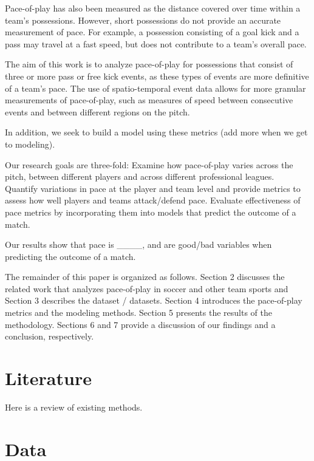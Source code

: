 \documentclass[]{book}
\begin{document}
Pace-of-play has also been measured as the distance covered over time within a team's possessions. However, short possessions do not provide an accurate measurement of pace. For example, a possession consisting of a goal kick and a pass may travel at a fast speed, but does not contribute to a team's overall pace.

The aim of this work is to analyze pace-of-play for possessions that consist of three or more pass or free kick events, as these types of events are more definitive of a team's pace. The use of spatio-temporal event data allows for more granular measurements of pace-of-play, such as measures of speed between consecutive events and between different regions on the pitch.

In addition, we seek to build a model using these metrics (add more when we get to modeling).

Our research goals are three-fold:
Examine how pace-of-play varies across the pitch, between different players and across different professional leagues.\\
Quantify variations in pace at the player and team level and provide metrics to assess how well players and teams attack/defend pace.
Evaluate effectiveness of pace metrics by incorporating them into models that predict the outcome of a match.

Our results show that pace is \_\_\_\_, and are good/bad variables when predicting the outcome of a match.

The remainder of this paper is organized as follows. Section 2 discusses the related work that analyzes pace-of-play in soccer and other team sports and Section 3 describes the dataset / datasets. Section 4 introduces the pace-of-play metrics and the modeling methods. Section 5 presents the results of the methodology. Sections 6 and 7 provide a discussion of our findings and a conclusion, respectively.

\hypertarget{literature}{%
\chapter{Literature}\label{literature}}

Here is a review of existing methods.

\hypertarget{data}{%
\chapter{Data}\label{data}}

\end{document}
